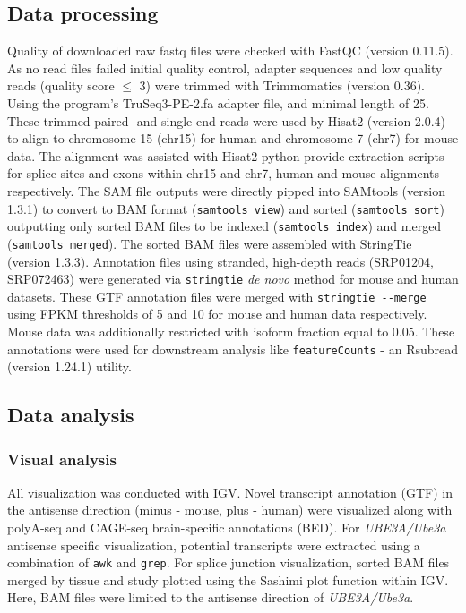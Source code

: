\subsection{Data processing}
Quality of downloaded raw fastq files were checked with FastQC \cite{Andrews_Fastqc} (version 0.11.5). As no read files failed initial quality control, adapter sequences and low quality reads (quality score $\leq$ 3) were trimmed with Trimmomatics \cite{Bolger2014} (version 0.36). Using the program's TruSeq3-PE-2.fa adapter file, and minimal length of 25. These trimmed paired- and single-end reads were used by Hisat2 \cite{Pertea2016,Kim2015} (version 2.0.4) to align to chromosome 15 (chr15) for human and chromosome 7 (chr7) for mouse data. The alignment was assisted with Hisat2 python provide extraction scripts for splice sites and exons within chr15 and chr7, human and mouse alignments respectively. The SAM file outputs were directly pipped into SAMtools \cite{Li2009} (version 1.3.1) to convert to BAM format (\texttt{samtools view}) and sorted (\texttt{samtools sort}) outputting only sorted BAM files to be indexed (\texttt{samtools index}) and merged (\texttt{samtools merged}). The sorted BAM files were assembled with StringTie \cite{Pertea2015,Pertea2016} (version 1.3.3). Annotation files using stranded, high-depth reads (SRP01204, SRP072463) were generated via \texttt{stringtie} \textit{de novo} method for mouse and human datasets. These GTF annotation files were merged with \texttt{stringtie -{}-merge} using FPKM thresholds of 5 and 10 for mouse and human data respectively. Mouse data was additionally restricted with isoform fraction equal to 0.05. These annotations were used for downstream analysis like \texttt{featureCounts} \cite{Liao2013b} - an Rsubread \cite{Liao2013a} (version 1.24.1) utility.

\subsection{Data analysis}
\subsubsection{Visual analysis}
All visualization was conducted with IGV. Novel transcript annotation (GTF) in the antisense direction (minus - mouse, plus - human)  were visualized along with polyA-seq and CAGE-seq brain-specific annotations (BED). For \textit{UBE3A/Ube3a} antisense specific visualization, potential transcripts were extracted using a combination of \texttt{awk} and \texttt{grep}. For splice junction visualization, sorted BAM files merged by tissue and study plotted using the Sashimi plot function within IGV. Here, BAM files were limited to the antisense direction of \textit{UBE3A/Ube3a}.

